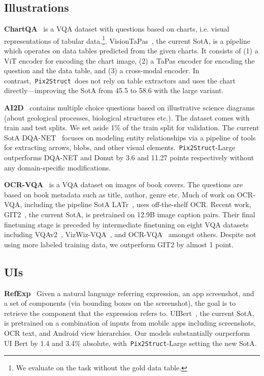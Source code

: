 \documentclass{article} %
\newcommand\ourmodel{{\texttt{Pix2Struct}}}
\begin{document}
\subsection{Illustrations}

\textbf{ChartQA}~\citep{masry-etal-2022-chartqa} is a VQA dataset with questions based on charts, i.e. visual representations of tabular data.\footnote{We evaluate on the task without the gold data table.}. VisionTaPas~\citep{masry-etal-2022-chartqa}, the current SotA, is a pipeline which operates on data tables predicted from the given charts. It consists of (1) a ViT encoder for encoding the chart image, (2) a TaPas encoder for encoding the question and the data table, and (3) a cross-modal encoder. In contrast,~\ourmodel~does not rely on table extractors and uses the chart directly---improving the SotA from 45.5 to 58.6 with the large variant.


\textbf{AI2D}~\citep{kembhavi2016diagram} contains multiple choice questions based on illustrative science diagrams (about geological processes, biological structures etc.). The dataset comes with train and test splits. We set aside 1\% of the train split for validation. The current SotA DQA-NET~\citep{kembhavi2016diagram} focuses on modeling  entity relationships via a pipeline of tools for extracting arrows, blobs, and other visual elements.~\ourmodel-Large outperforms DQA-NET and Donut by 3.6 and 11.27 points respectively without any domain-specific modifications. 

\textbf{OCR-VQA}~\citep{mishra2019ocr} is a VQA dataset on images of book covers. The questions are based on book metadata such as title, author, genre etc. Much of work on OCR-VQA, including the pipeline SotA LATr~\citep{biten2022latr}, uses off-the-shelf OCR. Recent work, GIT2~\citep{wang2022git}, the current SotA, is pretrained on 12.9B image caption pairs.  Their final finetuning stage is preceded by intermediate finetuning on eight VQA datasets including VQAv2~\citep{goyal2017making}, VizWiz-VQA~\citep{chen2022grounding}, and OCR-VQA~\citep{mishra2019ocr} amongst others. Despite not using more labeled training data, we outperform GIT2 by almost 1 point. 

\subsection{UIs}
\textbf{RefExp}~\citep{uibert} Given a natural language referring expression, an app screenshot, and a set of components (via bounding boxes on the screenshot), the goal is to retrieve the component that the expression refers
to. UIBert~\citep{uibert}, the current SotA, is pretrained on a combination of inputs from mobile apps including  screenshots, OCR text, and Android view hierarchies. Our models substantially ourperform UI Bert by 1.4 and 3.4\% absolute, with~\ourmodel-Large setting the new SotA.
\end{document}
